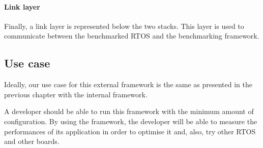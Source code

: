 \paragraph{Link layer}
Finally, a link layer is represented below the two stacks.
This layer is used to communicate between the benchmarked RTOS and the benchmarking framework.

\subsection{Use case}
Ideally, our use case for this external framework is the same as presented in the previous chapter with the internal framework.

A developer should be able to run this framework with the minimum amount of configuration.
By using the framework, the developer will be able to measure the performances of its application in order to optimise it and, also, try other RTOS and other boards.